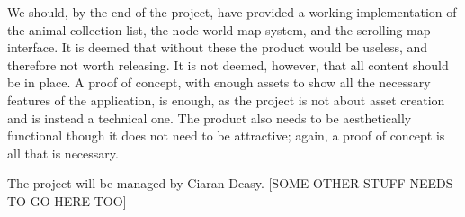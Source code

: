 \documentclass[]{report}
\begin{document}
We should, by the end of the project, have provided a working implementation of the animal collection list, the node world map system, and the scrolling map interface. It is deemed that without these the product would be useless, and therefore not worth releasing. It is not deemed, however, that all content should be in place. A proof of concept, with enough assets to show all the necessary features of the application, is enough, as the project is not about asset creation and is instead a technical one. The product also needs to be aesthetically functional though it does not need to be attractive; again, a proof of concept is all that is necessary.

The project will be managed by Ciaran Deasy. [SOME OTHER STUFF NEEDS TO GO HERE TOO]
\end{document}
